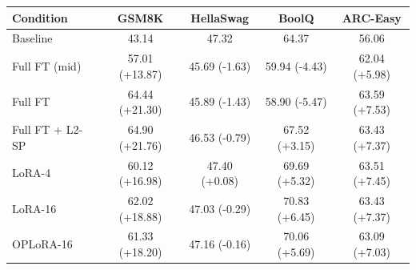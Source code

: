 \begin{tabular}{lcccc}
\toprule
Condition & GSM8K & HellaSwag & BoolQ & ARC-Easy \\
\midrule
Baseline & 43.14 & 47.32 & 64.37 & 56.06 \\
Full FT (mid) & 57.01 (+13.87) & 45.69 (-1.63) & 59.94 (-4.43) & 62.04 (+5.98) \\
Full FT & 64.44 (+21.30) & 45.89 (-1.43) & 58.90 (-5.47) & 63.59 (+7.53) \\
Full FT + L2-SP & 64.90 (+21.76) & 46.53 (-0.79) & 67.52 (+3.15) & 63.43 (+7.37) \\
LoRA-4 & 60.12 (+16.98) & 47.40 (+0.08) & 69.69 (+5.32) & 63.51 (+7.45) \\
LoRA-16 & 62.02 (+18.88) & 47.03 (-0.29) & 70.83 (+6.45) & 63.43 (+7.37) \\
OPLoRA-16 & 61.33 (+18.20) & 47.16 (-0.16) & 70.06 (+5.69) & 63.09 (+7.03) \\
\bottomrule
\end{tabular}